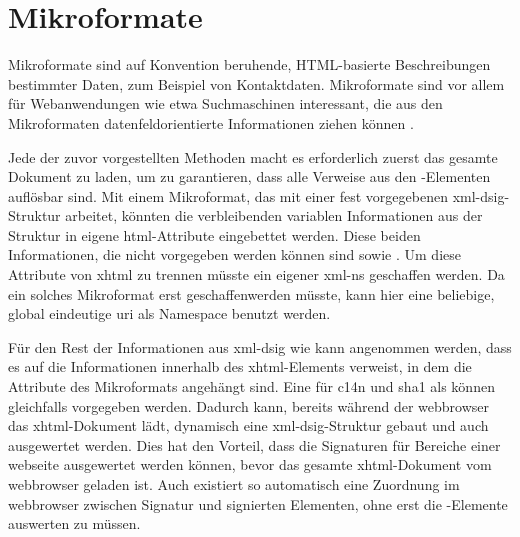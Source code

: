 


\section{Mikroformate}
Mikroformate sind auf Konvention beruhende, HTML-basierte Beschreibungen bestimmter Daten, zum Beispiel von Kontaktdaten. Mikroformate sind vor allem für
Webanwendungen wie etwa Suchmaschinen interessant, die aus den Mikroformaten datenfeldorientierte Informationen ziehen können \cite{mikroformate}.

Jede der zuvor vorgestellten Methoden macht es erforderlich zuerst das gesamte Dokument zu laden, um zu garantieren, dass alle Verweise aus den
-Elementen auflösbar sind. Mit einem Mikroformat, das mit einer fest vorgegebenen \gls{xml-dsig}-Struktur arbeitet, könnten die verbleibenden
variablen Informationen aus der Struktur in eigene \gls{html}-Attribute eingebettet werden. Diese beiden Informationen, die nicht vorgegeben werden können sind
 sowie . Um diese Attribute von \gls{xhtml} zu trennen müsste ein eigener \gls{xml-ns} geschaffen werden. Da ein
solches Mikroformat erst geschaffenwerden müsste, kann hier eine beliebige, global eindeutige \gls{uri} als Namespace benutzt werden.

Für den Rest der Informationen aus \gls{xml-dsig} wie  kann angenommen werden, dass es auf die Informationen innerhalb des
\gls{xhtml}-Elements verweist, in dem die Attribute des Mikroformats angehängt sind. Eine  für \gls{c14n} und \gls{sha1} als
 können gleichfalls vorgegeben werden. Dadurch kann, bereits während der \gls{webbrowser} das \gls{xhtml}-Dokument lädt, dynamisch eine
\gls{xml-dsig}-Struktur gebaut und auch ausgewertet werden. Dies hat den Vorteil, dass die Signaturen für Bereiche einer \gls{webseite} ausgewertet werden
können, bevor das gesamte \gls{xhtml}-Dokument vom \gls{webbrowser} geladen ist. Auch existiert so automatisch eine Zuordnung im \gls{webbrowser} zwischen
Signatur und signierten Elementen, ohne erst die -Elemente auswerten zu müssen.



